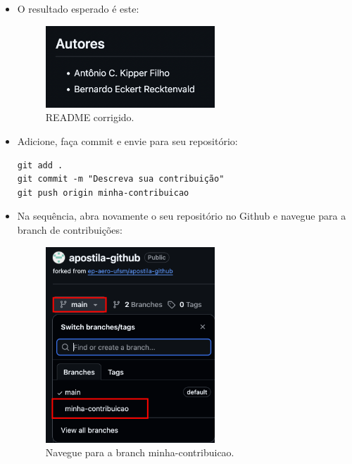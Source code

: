 \begin{itemize}
        \item O resultado esperado é este:

        \begin{figure}[H]
        \centering
        \includegraphics[width=0.6\textwidth]{imgs/tutorial_contribuicao/README_depois_modif.png}
        \caption{README corrigido.}
        \label{fig:README_depois_modif}
    \end{figure}

        \item Adicione, faça commit e envie para seu repositório:
        \begin{lstlisting}[style=shellstyle]
git add .
git commit -m "Descreva sua contribuição"
git push origin minha-contribuicao
        \end{lstlisting}

        \item Na sequência, abra novamente o seu repositório no Github e navegue para a branch de contribuições:

         \begin{figure}[H]
        \centering
        \includegraphics[width=0.6\textwidth]{imgs/tutorial_contribuicao/navegando_branch.png}
        \caption{Navegue para a branch minha-contribuicao.}
        \label{fig:navegando_branch}
    \end{figure}


\end{itemize}
